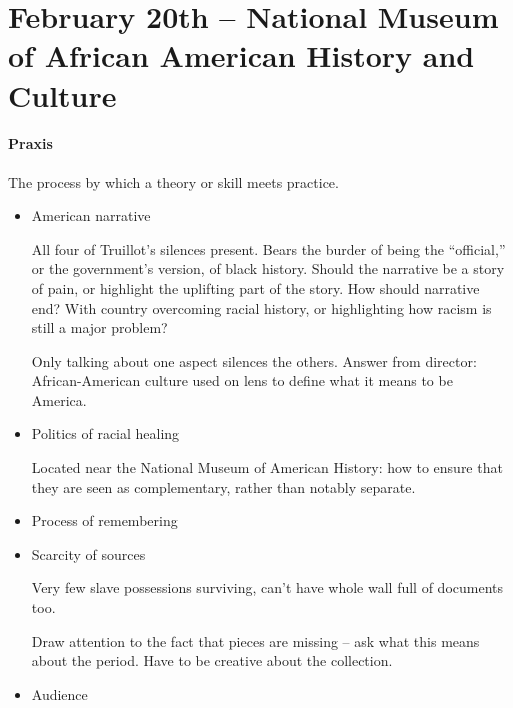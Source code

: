 \section{February 20th -- National Museum of African American History and Culture} 

\paragraph{Praxis} The process by which a theory or skill meets practice.

\begin{itemize}
  \item American narrative

  All four of Truillot's silences present. Bears the burder of being the ``official,'' or the government's version, of black history. Should the narrative be a story of pain, or highlight the uplifting part of the story. How should narrative end? With country overcoming racial history, or highlighting how racism is still a major problem?

  Only talking about one aspect silences the others. Answer from director: African-American culture used on lens to define what it means to be America.

  \item Politics of racial healing

  Located near the National Museum of American History: how to ensure that they are seen as complementary, rather than notably separate.

  \item Process of remembering
  \item Scarcity of sources

  Very few slave possessions surviving, can't have whole wall full of documents too. 

  Draw attention to the fact that pieces are missing -- ask what this means about the period. Have to be creative about the collection.

  \item Audience
\end{itemize}